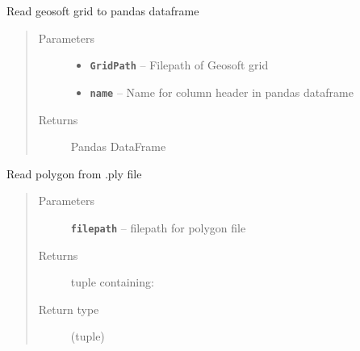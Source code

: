 \documentclass[letterpaper,10pt,english]{sphinxmanual}
\begin{document}

\begin{fulllineitems}
\label{index:pygeos.io.read_gxgrid}
Read geosoft grid to pandas dataframe
\begin{quote}\begin{description}
\item[{Parameters}] \leavevmode\begin{itemize}
\item {} 
\textbf{\texttt{GridPath}} -- Filepath of Geosoft grid

\item {} 
\textbf{\texttt{name}} -- Name for column header in pandas dataframe

\end{itemize}

\item[{Returns}] \leavevmode
Pandas DataFrame

\end{description}\end{quote}

\end{fulllineitems}


\begin{fulllineitems}
\label{index:pygeos.io.read_ply}
Read polygon from .ply file
\begin{quote}\begin{description}
\item[{Parameters}] \leavevmode
\textbf{\texttt{filepath}} -- filepath for polygon file

\item[{Returns}] \leavevmode

tuple containing:



\item[{Return type}] \leavevmode
(tuple)

\end{description}\end{quote}

\end{fulllineitems}
\end{document}
